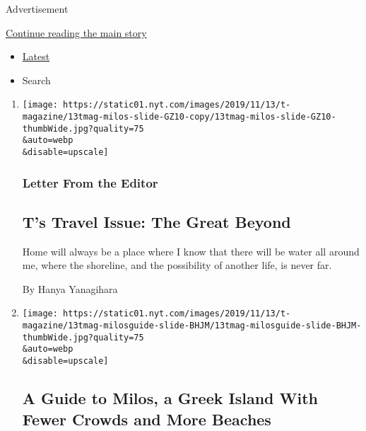 Advertisement

\protect\hyperlink{after-mid1}{Continue reading the main story}

\begin{itemize}
\tightlist
\item
  \protect\hyperlink{stream-panel}{Latest}
\item
  Search
\end{itemize}

\begin{enumerate}
\def\labelenumi{\arabic{enumi}.}
\item
  \href{/2019/11/15/t-magazine/ts-travel-issue-the-great-beyond.html}{}

  \texttt{[image: https://static01.nyt.com/images/2019/11/13/t-magazine/13tmag-milos-slide-GZ10-copy/13tmag-milos-slide-GZ10-thumbWide.jpg?quality=75\\\&auto=webp\\\&disable=upscale]}

  \hypertarget{letter-from-the-editor}{%
  \subsubsection{Letter From the Editor}\label{letter-from-the-editor}}

  \hypertarget{ts-travel-issue-the-great-beyond}{%
  \subsection{T's Travel Issue: The Great
  Beyond}\label{ts-travel-issue-the-great-beyond}}

  Home will always be a place where I know that there will be water all
  around me, where the shoreline, and the possibility of another life,
  is never far.

  By Hanya Yanagihara
\item
  \href{/2019/11/14/t-magazine/milos-greece-travel-guide.html}{}

  \texttt{[image: https://static01.nyt.com/images/2019/11/13/t-magazine/13tmag-milosguide-slide-BHJM/13tmag-milosguide-slide-BHJM-thumbWide.jpg?quality=75\\\&auto=webp\\\&disable=upscale]}

  \hypertarget{a-guide-to-milos-a-greek-island-with-fewer-crowds-and-more-beaches}{%
  \subsection{A Guide to Milos, a Greek Island With Fewer Crowds and
  More
  Beaches}\label{a-guide-to-milos-a-greek-island-with-fewer-crowds-and-more-beaches}}


\end{enumerate}
